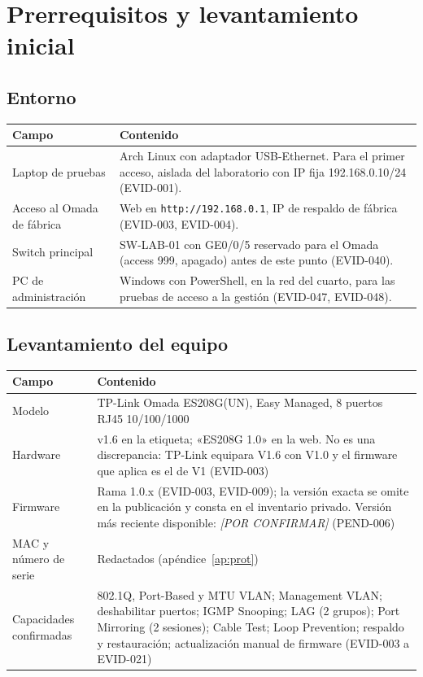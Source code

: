 \documentclass[11pt,a4paper]{article}
\newcommand{\pc}{\textcolor{muted}{\textit{[POR CONFIRMAR]}}}
\newcommand{\cab}{\rowcolor{light}}
\begin{document}
\section{Prerrequisitos y levantamiento inicial}
\subsection{Entorno}
\begin{tabularx}{\textwidth}{L{3.8cm} Z}
  \toprule
  \cab\textbf{Campo} & \textbf{Contenido}\\
  \midrule
  Laptop de pruebas & Arch Linux con adaptador USB-Ethernet. Para el primer acceso, aislada del laboratorio con IP fija 192.168.0.10/24 (EVID-001).\\
  Acceso al Omada de fábrica & Web en \texttt{http://192.168.0.1}, IP de respaldo de fábrica (EVID-003, EVID-004).\\
  Switch principal & SW-LAB-01 con GE0/0/5 reservado para el Omada (access 999, apagado) antes de este punto (EVID-040).\\
  PC de administración & Windows con PowerShell, en la red del cuarto, para las pruebas de acceso a la gestión (EVID-047, EVID-048).\\
  \bottomrule
\end{tabularx}

\subsection{Levantamiento del equipo}
\begin{tabularx}{\textwidth}{L{4.2cm} Z}
  \toprule
  \cab\textbf{Campo} & \textbf{Contenido}\\
  \midrule
  Modelo & TP-Link Omada ES208G(UN), Easy Managed, 8 puertos RJ45 10/100/1000\\
  Hardware & v1.6 en la etiqueta; «ES208G 1.0» en la web. No es una discrepancia: TP-Link equipara V1.6 con V1.0 y el firmware que aplica es el de V1 (EVID-003)\\
  Firmware & Rama 1.0.x (EVID-003, EVID-009); la versión exacta se omite en la publicación y consta en el inventario privado. Versión más reciente disponible: \pc{} (PEND-006)\\
  MAC y número de serie & Redactados (apéndice~\ref{ap:prot})\\
  Capacidades confirmadas & 802.1Q, Port-Based y MTU VLAN; Management VLAN; deshabilitar puertos; IGMP Snooping; LAG (2 grupos); Port Mirroring (2 sesiones); Cable Test; Loop Prevention; respaldo y restauración; actualización manual de firmware (EVID-003 a EVID-021)\\
  \bottomrule
\end{tabularx}
\end{document}
